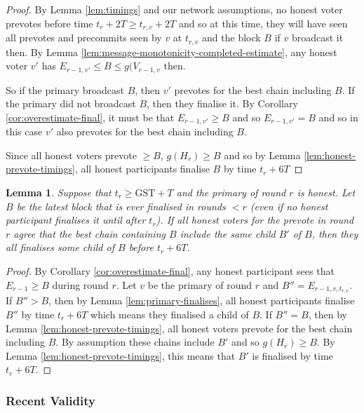 \documentclass{article}
\newtheorem{lemma}[theorem]{Lemma}
\def\GST{\mathrm{GST}}
\begin{document}
\begin{proof} By Lemma \ref{lem:timings} and our network assumptions, no honest voter  prevotes before time $t_r+2T \geq t_{r,v}+2T$ and so at this time, they will have seen all prevotes and precommits seen by $v$ at $t_{r,v}$ and the block $B$ if $v$ broadcast it then. By Lemma \ref{lem:message-monotonicity-completed-estimate}, any honest voter $v'$ has $E_{r-1,v'} \leq B \leq g(V_{r-1,v}$ then.

So if the primary broadcast $B$, then $v'$ prevotes for the best chain including $B$. If the primary did not broadcast $B$, then they finalise it. By Corollary \ref{cor:overestimate-final}, it must be that $E_{r-1,v'} \geq B$ and so $E_{r-1,v'}=B$ and so in this case $v'$ also prevotes for the best chain including $B$.

Since all honest voters prevote $\geq B$, $g(H_r) \geq B$ and so by Lemma \ref{lem:honest-prevote-timings}, all honest participants finalise $B$ by time $t_r+6T$
\end{proof}



\begin{lemma}
 Suppose that $t_r \geq \GST+T$ and the primary of round $r$ is honest. 
Let $B$ be the latest block that is ever finalised in rounds  $<r$ (even if no honest participant finalises it until after $t_r$). If all honest voters for the prevote in round $r$ agree that the best chain containing $B$ include the same child $B'$ of $B$, then they all finalises some child of $B$ before $t_r+6T$.
\end{lemma}

\begin{proof} By Corollary \ref{cor:overestimate-final}, any honest participant sees that $E_{r-1} \geq B$ during round $r$. Let $v$ be the primary of round $r$ and $B''=E_{r-1,v,t_{r,v}}$. If $B'' > B$, then by Lemma \ref{lem:primary-finalises}, all honest participants finalise $B''$ by time $t_r+6T$ which means they finalised a child of $B$. If $B''=B$, then by Lemma \ref{lem:honest-prevote-timings}, all honest voters prevote for the best chain including $B$.
By assumption these chains include $B'$ and so $g(H_r) \geq B$. By Lemma \ref{lem:honest-prevote-timings}, this means that $B'$ is finalised by time $t_r+6T$.
\end{proof}







\subsubsection{Recent Validity}
\end{document}
